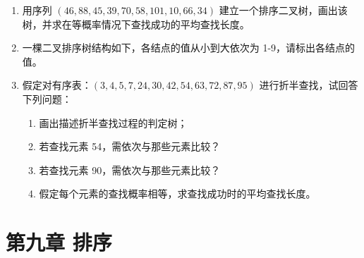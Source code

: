 \documentclass[12pt, a4paper]{article}
\begin{document}
\begin{enumerate}
    \item 用序列 $(46, 88, 45, 39, 70, 58, 101, 10, 66, 34)$ 建立一个排序二叉树，画出该树，并求在等概率情况下查找成功的平均查找长度。
    
    \item 一棵二叉排序树结构如下，各结点的值从小到大依次为 1-9，请标出各结点的值。
    
    \item 假定对有序表：$(3, 4, 5, 7, 24, 30, 42, 54, 63, 72, 87, 95)$ 进行折半查找，试回答下列问题：
    \begin{enumerate}
        \item 画出描述折半查找过程的判定树；
        \item 若查找元素 54，需依次与那些元素比较？
        \item 若查找元素 90，需依次与那些元素比较？
        \item 假定每个元素的查找概率相等，求查找成功时的平均查找长度。
    \end{enumerate}
\end{enumerate}

\section{第九章 排序}
\end{document}
